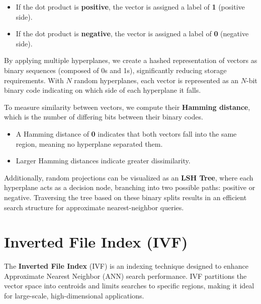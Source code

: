 \begin{itemize}
    \item If the dot product is \textbf{positive}, the vector is assigned a label of \textbf{1} (positive side).  
    \item If the dot product is \textbf{negative}, the vector is assigned a label of \textbf{0} (negative side).  
\end{itemize}

By applying multiple hyperplanes, we create a hashed representation of vectors as binary sequences (composed of 0s and 1s), significantly reducing storage requirements. With $N$ random hyperplanes, each vector is represented as an $N$-bit binary code indicating on which side of each hyperplane it falls.

To measure similarity between vectors, we compute their \textbf{Hamming distance}, which is the number of differing bits between their binary codes.  
\begin{itemize}
    \item A Hamming distance of \textbf{0} indicates that both vectors fall into the same region, meaning no hyperplane separated them.  
    \item Larger Hamming distances indicate greater dissimilarity.
\end{itemize}

Additionally, random projections can be visualized as an \textbf{LSH Tree}, where each hyperplane acts as a decision node, branching into two possible paths: positive or negative. Traversing the tree based on these binary splits results in an efficient search structure for approximate nearest-neighbor queries.

\section{Inverted File Index (IVF)}
The \textbf{Inverted File Index} (IVF) is an indexing technique designed to enhance Approximate Nearest Neighbor (ANN) search performance. IVF partitions the vector space into centroids and limits searches to specific regions, making it ideal for large-scale, high-dimensional applications.

